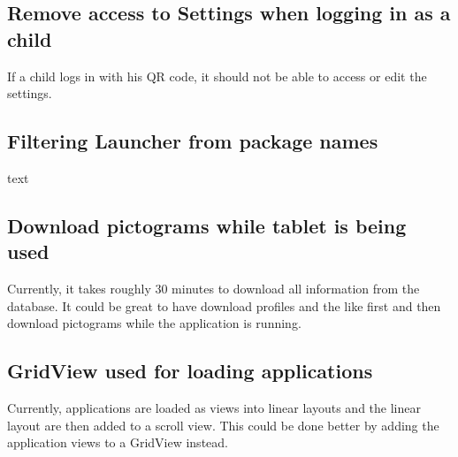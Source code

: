 \subsection{Remove access to Settings when logging in as a child}

If a child logs in with his QR code, it should not be able to access or edit the settings.

\subsection{Filtering Launcher from package names}
text

\subsection{Download pictograms while tablet is being used}
Currently, it takes roughly 30 minutes to download all information from the database.
It could be great to have \launcher download profiles and the like first and then download pictograms while the application is running.

\subsection{GridView used for loading applications}

Currently, applications are loaded as views into linear layouts and the linear layout are then added to a scroll view.
This could be done better by adding the application views to a GridView instead.
